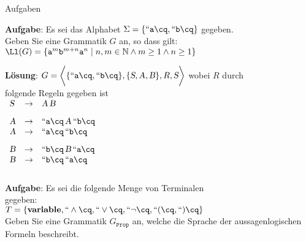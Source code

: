 \begin{slide}{}
\normalsize

\begin{center}
Aufgaben
\end{center}

\footnotesize
\textbf{Aufgabe}: Es sei das Alphabet $\Sigma = \{``\mathtt{a}\cq, ``\mathtt{b}\cq\}$ gegeben. \\[0.3cm]
\hspace*{3.0cm} Geben Sie eine Grammatik $G$ an, so dass gilt: \\[0.6cm]
\hspace*{1.3cm}
 $\Ll(G) = \{ \mathtt{a}^m\mathtt{b}^{m+n}\mathtt{a}^n \;|\; n,m \in \mathbb{N} \wedge m \geq 1 \wedge n \geq 1 \}$

\textbf{L\"osung}: $G = \bigg\langle \{``\mathtt{a}\cq, ``\mathtt{b}\cq \}, \{\textsl{S}, \textsl{A}, \textsl{B}\}, R, \textsl{S} \bigg\rangle$ wobei $R$ durch  \\[0.3cm]
\hspace*{2.5cm}  folgende Regeln gegeben ist \\[0.8cm]
\hspace*{3.3cm} $
\begin{array}{lcl}
    \textsl{S} & \rightarrow & \textsl{A}\,\textsl{B} \\[0.3cm]
    \textsl{A} & \rightarrow & ``\mathtt{a}\cq\,\textsl{A}\,``\mathtt{b}\cq \\
    \textsl{A} & \rightarrow & ``\mathtt{a}\cq\,``\mathtt{b}\cq \\[0.3cm]
    \textsl{B} & \rightarrow & ``\mathtt{b}\cq\,\textsl{B}\,``\mathtt{a}\cq \\
    \textsl{B} & \rightarrow & ``\mathtt{b}\cq\,``\mathtt{a}\cq \\[0.3cm]
\end{array}
$

\textbf{Aufgabe}: Es sei die folgende Menge von Terminalen \\[0.3cm]
\hspace*{3.0cm} gegeben: \\[0.6cm]
\hspace*{1.3cm} $T = \{ \mathbf{variable}, ``\wedge\cq, ``\vee\cq, ``\neg\cq,
``\mathtt{(}\cq, ``\mathtt{)}\cq \}$ \\[0.6cm]
Geben Sie eine Grammatik $G_{\mathtt{Prop}}$ an, welche die Sprache der aussagenlogischen Formeln beschreibt.


\end{slide}
